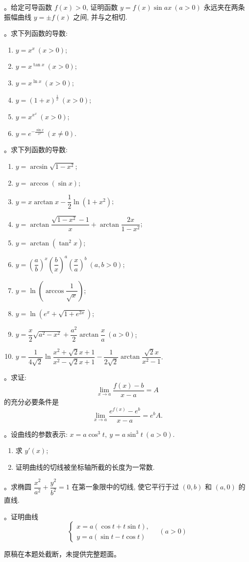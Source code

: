 。给定可导函数 $f(x)>0$, 证明函数 $y=f(x)\sin ax\ (a>0)$ 永远夹在两条振幅曲线 $y=\pm f(x)$ 之间, 并与之相切.

。求下列函数的导数:
\begin{enumerate}
  \item $y=x^x\ (x>0)$;
  \item $y=x^{\tan x}\ (x>0)$;
  \item $y=x^{\ln x}\ (x>0)$;
  \item $y=(1+x)^{\frac1x}\ (x>0)$;
  \item $y=x^{x^x}\ (x>0)$;
  \item $y=e^{-\frac{\sin x}{x^2}}\ (x\ne0)$.
\end{enumerate}

。求下列函数的导数:
\begin{enumerate}
  \item $y=\arcsin\sqrt{1-x^2}$;
  \item $y=\arccos(\sin x)$;
  \item $y=x\arctan x-\dfrac12\ln(1+x^2)$;
  \item $y=\arctan\dfrac{\sqrt{1-x^2}-1}{x}+\arctan\dfrac{2x}{1-x^2}$;
  \item $y=\arctan(\tan^2x)$;
  \item $y=\left(\dfrac ab\right)^x\left(\dfrac bx\right)^a\left(\dfrac xa\right)^b\ (a,b>0)$;
  \item $y=\ln\left(\arccos\dfrac1{\sqrt{x}}\right)$;
  \item $y=\ln(e^x+\sqrt{1+e^{2x}})$;
  \item $y=\dfrac x2\sqrt{a^2-x^2}+\dfrac{a^2}{2}\arctan\dfrac xa\ (a>0)$;
  \item $y=\dfrac1{4\sqrt2}\ln\dfrac{x^2+\sqrt2x+1}{x^2-\sqrt2x+1}-\dfrac1{2\sqrt2}\arctan\dfrac{\sqrt2x}{x^2-1}$.
\end{enumerate}

。求证:
\[
  \lim_{x\to a}\frac{f(x)-b}{x-a}=A
\]
的充分必要条件是
\[
  \lim_{x\to a}\frac{e^{f(x)}-e^b}{x-a}=e^bA.
\]

。设曲线的参数表示: $x=a\cos^3t,\ y=a\sin^3t\ (a>0)$.
\begin{enumerate}
  \item 求 $y'(x)$;
  \item 证明曲线的切线被坐标轴所截的长度为一常数.
\end{enumerate}

。求椭圆 $\dfrac{x^2}{a^2}+\dfrac{y^2}{b^2}=1$ 在第一象限中的切线, 使它平行于过 $(0,b)$ 和 $(a,0)$ 的直线.

。证明曲线
\[
  \begin{cases}
    x=a(\cos t+t\sin t),\\
    y=a(\sin t-t\cos t)
  \end{cases}
  \quad(a>0)
\]

\begin{remark}
原稿在本题处截断，未提供完整题面。
\end{remark}

